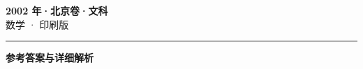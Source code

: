 \documentclass[zihao=5, a4paper]{ctexart}
\begin{document}
\begin{center}
  {\Large\bfseries 2002 年·北京卷·文科}\\[4pt]
  {\large 数学 · 印刷版}
\end{center}
\medskip
{}

\par\bigskip\hrule\bigskip
{}
\begin{center}{\large\bfseries 参考答案与详细解析}\end{center}
\smallskip

\end{document}
